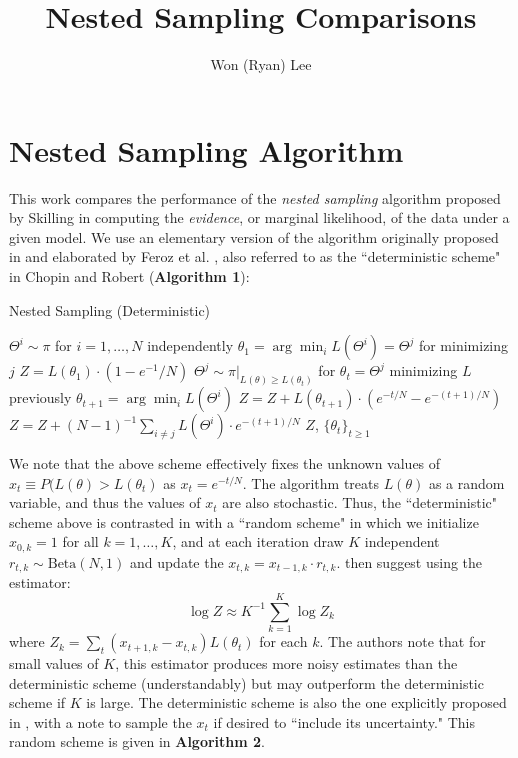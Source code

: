 \documentclass[psamsfonts]{amsart}
\title{Nested Sampling Comparisons}
\author{Won (Ryan) Lee}
\begin{document}
%
%

\maketitle


\section{Nested Sampling Algorithm}

This work compares the performance of the {\em nested sampling} algorithm proposed by Skilling \cite{skilling06} in computing the {\em evidence}, or marginal likelihood, of the data under a given model. We use an elementary version of the algorithm originally proposed in \cite{skilling06} and elaborated by Feroz et al. \cite{feroz14}, also referred to as the ``deterministic scheme" in Chopin and Robert \cite{chopin09} ({\bf Algorithm 1}):

\begin{algorithm}
\caption{Nested Sampling (Deterministic)}
\begin{algorithmic}
\State $\Theta^i \sim \pi$ for $i =1, \dots, N$ independently
\State $\theta_1 = \arg\min_i L(\Theta^i) = \Theta^j$ for minimizing $j$
\State $Z = L(\theta_1) \cdot (1-e^{-1}/N)$
\State $\Theta^j \sim \pi|_{L(\theta) \geq L(\theta_t)}$ for $\theta_t = \Theta^j$ minimizing $L$ previously
\State $\theta_{t+1} = \arg\min_i L(\Theta^i)$
\State $Z = Z + L(\theta_{t+1})\cdot (e^{-t/N} - e^{-(t+1)/N})$
\EndWhile
\State $Z = Z + (N-1)^{-1} \sum_{i\neq j} L(\Theta^i) \cdot e^{-(t+1)/N}$
\State\Return $Z$, $\{\theta_t\}_{t\geq 1}$
\end{algorithmic}
\end{algorithm}

We note that the above scheme effectively fixes the unknown values of $x_t \equiv P(L(\theta) > L(\theta_t)$ as $x_t = e^{-t/N}$. The algorithm treats $L(\theta)$ as a random variable, and thus the values of $x_t$ are also stochastic. Thus, the ``deterministic" scheme above is contrasted in \cite{chopin09} with a ``random scheme" in which we initialize $x_{0,k} = 1$ for all $k = 1, \dots, K$, and at each iteration draw $K$ independent $r_{t,k} \sim \text{Beta}(N,1)$ and update the $x_{t,k} = x_{t-1,k} \cdot r_{t,k}$. \cite{chopin09} then suggest using the estimator:
$$\log Z \approx K^{-1} \sum_{k=1}^K \log Z_k$$
where $Z_k = \sum_t (x_{t+1,k} - x_{t,k})L(\theta_t)$ for each $k$. The authors note that for small values of $K$, this estimator produces more noisy estimates than the deterministic scheme (understandably) but may outperform the deterministic scheme if $K$ is large. The deterministic scheme is also the one explicitly proposed in \cite{skilling06}, with a note to sample the $x_t$ if desired to ``include its uncertainty."  This random scheme is given in {\bf Algorithm 2}.
\end{document}
